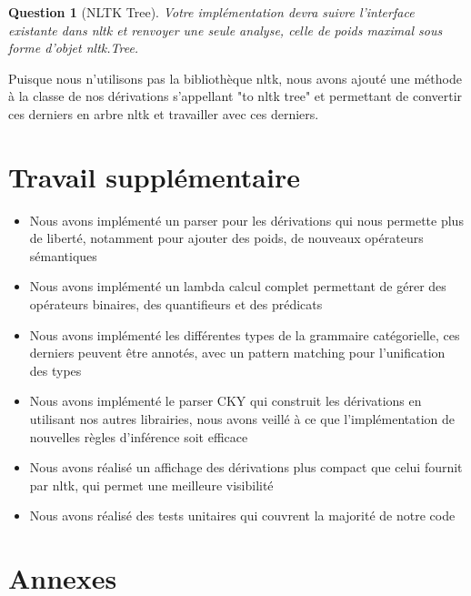 \documentclass[12pt]{article}
\theoremstyle{exostyle}
\newtheorem{exo}{Question}[section]
\begin{document}
\begin{exo}[NLTK Tree]
\textit{Votre implémentation devra suivre l’interface existante dans nltk et renvoyer
une seule analyse, celle de poids maximal sous forme d’objet nltk.Tree.}
\end{exo}

Puisque nous n'utilisons pas la bibliothèque nltk, nous avons ajouté une méthode à la classe de nos dérivations s'appellant "to nltk tree" et permettant de convertir ces derniers en arbre nltk et travailler avec ces derniers.

\section{Travail supplémentaire}

\begin{itemize}
\item Nous avons implémenté un parser pour les dérivations qui nous permette plus de liberté, notamment pour ajouter des poids, de nouveaux opérateurs sémantiques
\item Nous avons implémenté un lambda calcul complet permettant de gérer des opérateurs binaires, des quantifieurs et des prédicats
\item Nous avons implémenté les différentes types de la grammaire catégorielle, ces derniers peuvent être annotés, avec un pattern matching pour l'unification des types
\item Nous avons implémenté le parser CKY qui construit les dérivations en utilisant nos autres librairies, nous avons veillé à ce que l'implémentation de nouvelles règles d'inférence soit efficace
\item Nous avons réalisé un affichage des dérivations plus compact que celui fournit par nltk, qui permet une meilleure visibilité
\item Nous avons réalisé des tests unitaires qui couvrent la majorité de notre code
\end{itemize}
\section{Annexes}
\end{document}
